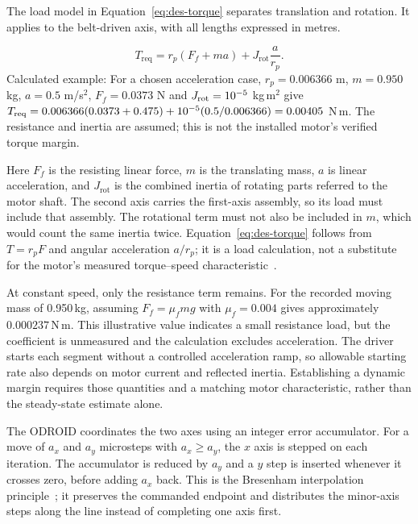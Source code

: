 The load model in Equation~\ref{eq:des-torque} separates translation and rotation. It applies to the belt-driven axis, with all lengths expressed in metres.

\begin{equation}
T_{\mathrm{req}}=r_p(F_f+ma)+J_{\mathrm{rot}}\frac{a}{r_p}.
\label{eq:des-torque}
\end{equation}
Calculated example: For a chosen acceleration case, $r_p=0.006366$ m, $m=0.950$ kg, $a=0.5$ m/s$^2$, $F_f=0.0373$ N and $J_{\rm rot}=10^{-5}$ kg\,m$^2$ give $T_{\rm req}=0.006366(0.0373+0.475)+10^{-5}(0.5/0.006366)=0.00405$ N\,m. The resistance and inertia are assumed; this is not the installed motor's verified torque margin.

Here $F_f$ is the resisting linear force, $m$ is the translating mass, $a$ is linear acceleration, and $J_{\mathrm{rot}}$ is the combined inertia of rotating parts referred to the motor shaft. The second axis carries the first-axis assembly, so its load must include that assembly. The rotational term must not also be included in $m$, which would count the same inertia twice. Equation~\ref{eq:des-torque} follows from $T=r_pF$ and angular acceleration $a/r_p$; it is a load calculation, not a substitute for the motor's measured torque--speed characteristic~\cite[page to verify]{acarnley2002}.

At constant speed, only the resistance term remains. For the recorded moving mass of 0.950\,kg, assuming $F_f=\mu_fmg$ with $\mu_f=0.004$ gives approximately $0.000237$\,N\,m. This illustrative value indicates a small resistance load, but the coefficient is unmeasured and the calculation excludes acceleration. The driver starts each segment without a controlled acceleration ramp, so allowable starting rate also depends on motor current and reflected inertia. Establishing a dynamic margin requires those quantities and a matching motor characteristic, rather than the steady-state estimate alone.

The ODROID coordinates the two axes using an integer error accumulator. For a move of $a_x$ and $a_y$ microsteps with $a_x\geq a_y$, the $x$ axis is stepped on each iteration. The accumulator is reduced by $a_y$ and a $y$ step is inserted whenever it crosses zero, before adding $a_x$ back. This is the Bresenham interpolation principle~\cite[p.~28]{bresenham1965}; it preserves the commanded endpoint and distributes the minor-axis steps along the line instead of completing one axis first.

